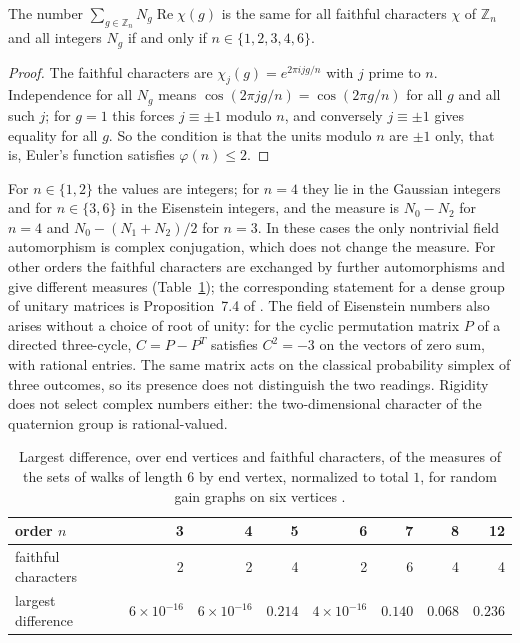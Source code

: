 \begin{proposition}\label{prop:rigid}
The number $\sum_{g\in\mathbb{Z}_n}N_g\operatorname{Re}\chi(g)$ is the same for all faithful characters $\chi$ of $\mathbb{Z}_n$ and all integers $N_g$ if and only if $n\in\{1,2,3,4,6\}$.
\end{proposition}
\begin{proof}
The faithful characters are $\chi_j(g)=e^{2\pi ijg/n}$ with $j$ prime to $n$. Independence for all $N_g$ means $\cos(2\pi jg/n)=\cos(2\pi g/n)$ for all $g$ and all such $j$; for $g=1$ this forces $j\equiv\pm1$ modulo $n$, and conversely $j\equiv\pm1$ gives equality for all $g$. So the condition is that the units modulo $n$ are $\pm1$ only, that is, Euler's function satisfies $\varphi(n)\le2$.
\end{proof}

For $n\in\{1,2\}$ the values are integers; for $n=4$ they lie in the Gaussian integers and for $n\in\{3,6\}$ in the Eisenstein integers, and the measure is $N_0-N_2$ for $n=4$ and $N_0-(N_1+N_2)/2$ for $n=3$. In these cases the only nontrivial field automorphism is complex conjugation, which does not change the measure. For other orders the faithful characters are exchanged by further automorphisms and give different measures (Table~\ref{tab:char}); the corresponding statement for a dense group of unitary matrices is Proposition~7.4 of \cite{g7}. The field of Eisenstein numbers also arises without a choice of root of unity: for the cyclic permutation matrix $P$ of a directed three-cycle, $C=P-P^{T}$ satisfies $C^2=-3$ on the vectors of zero sum, with rational entries. The same matrix acts on the classical probability simplex of three outcomes, so its presence does not distinguish the two readings. Rigidity does not select complex numbers either: the two-dimensional character of the quaternion group is rational-valued.

\begin{table}[ht]\centering\small
\begin{tabular}{@{}lrrrrrrr@{}}\toprule
order $n$ & 3 & 4 & 5 & 6 & 7 & 8 & 12\\\midrule
faithful characters & 2 & 2 & 4 & 2 & 6 & 4 & 4\\
largest difference & $6\times10^{-16}$ & $6\times10^{-16}$ & $0.214$ & $4\times10^{-16}$ & $0.140$ & $0.068$ & $0.236$\\\bottomrule
\end{tabular}
\caption{Largest difference, over end vertices and faithful characters, of the measures of the sets of walks of length $6$ by end vertex, normalized to total $1$, for random gain graphs on six vertices \cite{comp2}.}\label{tab:char}
\end{table}

